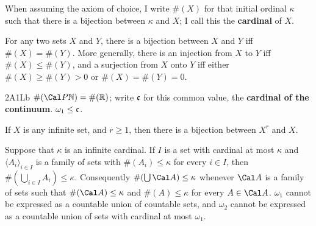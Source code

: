       
      

      
 When assuming the axiom of choice,  I write $\#(X)$ for that initial 
ordinal $\kappa$ such that there is a bijection between $\kappa$ and 
$X$;  I call this the {\bf cardinal} of $X$. 
      
 For 
any two sets $X$ and $Y$, there is a bijection between $X$ and $Y$ iff 
$\#(X)=\#(Y)$.   More generally, there is an injection from $X$ to $Y$ 
iff $\#(X)\le\#(Y)$, and a surjection from $X$ onto $Y$ iff 
either $\#(X)\ge\#(Y)>0$ or $\#(X)=\#(Y)=0$. 
      
\spheader 2A1Lb 
$\#(\Cal P\Bbb N)=\#(\Bbb R)$; 
write $\frak c$ for this common value, the {\bf cardinal of the 
continuum}.    
$\omega_1\le\frak c$. 
      
If $X$ is any infinite set, and $r\ge 1$, then there is a bijection 
between $X^r$ and $X$.       
      
 Suppose that $\kappa$ is an infinite cardinal. 
If $I$ is a set with cardinal at most $\kappa$ and  
$\langle A_i\rangle_{i\in I}$ is a family of sets with $\#(A_i)\le\kappa$  
for 
every $i\in I$, then  $\#(\bigcup_{i\in I}A_i)\le\kappa$.   Consequently 
$\#(\bigcup\Cal A)\le\kappa$ whenever $\Cal A$ is a family of sets such 
that $\#(\Cal A)\le\kappa$ and $\#(A)\le\kappa$ for every $A\in\Cal A$. 
 $\omega_1$ cannot be expressed as a countable union of 
countable sets, and $\omega_2$ cannot be expressed as a countable union 
of sets with cardinal at most $\omega_1$. 
      
